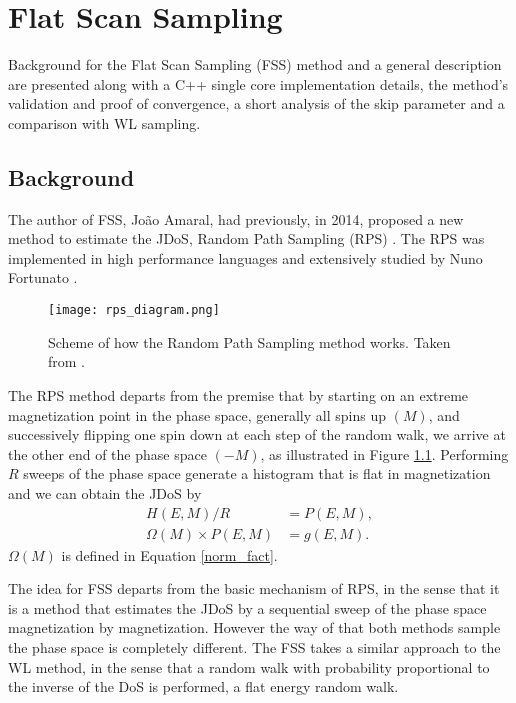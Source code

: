 \chapter{Flat Scan Sampling}

	Background for the Flat Scan Sampling (FSS) method and a general description are presented along with a C++ single core implementation details, the method's validation and proof of convergence, a short analysis of the skip parameter and a comparison with WL sampling.

\section{Background}

	The author of FSS, João Amaral, had previously, in 2014, proposed a new method to estimate the JDoS, Random Path Sampling (RPS) \cite{Amaral2014}.  The RPS was implemented in high performance languages and extensively studied by Nuno Fortunato \cite{Fortunato2015,Fortunato2016,Korotana2016}. 
	
\begin{figure}[h]
	\centering
	\texttt{[image: rps\_diagram.png]}
	\caption{Scheme of how the Random Path Sampling method works. Taken from \cite{Fortunato2015}.}
	\label{rps_dia}
\end{figure}
	
	The RPS method departs from the premise that by starting on an extreme magnetization point in the phase space, generally all spins up $(M)$, and successively flipping one spin down at each step of the random walk, we arrive at the other end of the phase space $(-M)$, as illustrated in Figure \ref{rps_dia}. Performing $R$ sweeps of the phase space generate a histogram that is flat in magnetization and we can obtain the JDoS by 
\begin{align}
	H(E, M)/R &= P(E, M), \\
	\Omega(M) \times P(E, M) &= g(E, M).
\end{align}
$\Omega(M)$ is defined in Equation \ref{norm_fact}.

	The idea for FSS departs from the basic mechanism of RPS, in the sense that it is a method that estimates the JDoS by a sequential sweep of the phase space magnetization by magnetization. However the way of that both methods sample the phase space is completely different. The FSS takes a similar approach to the WL method, in the sense that a random walk with probability proportional to the inverse of the DoS is performed, a flat energy random walk.
	
